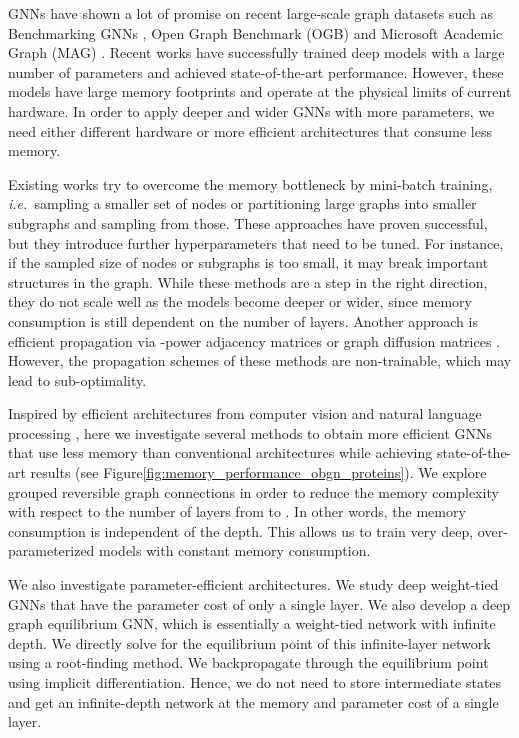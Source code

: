 \documentclass{article}
\newcommand{\ie}{\emph{i.e.~}}
\newcommand{\figLabel}{Figure\xspace}
\begin{document}
GNNs have shown a lot of promise on recent large-scale graph datasets such as Benchmarking GNNs \citep{dwivedi2020benchmarkgnns}, Open Graph Benchmark (OGB) \citep{hu2020open,hu2021ogblsc} and Microsoft Academic Graph (MAG) \citep{wang2020microsoft}. Recent works \citep{li2019deepgcns,li2020deepergcn,chen2020simple} have successfully trained deep models with a large number of parameters and achieved state-of-the-art performance. 
However, these models have large memory footprints and operate at the physical limits of current hardware. 
In order to apply deeper and wider GNNs with more parameters, we need either different hardware or more efficient architectures that consume less memory.

Existing works try to overcome the memory bottleneck by mini-batch training, \ie sampling a smaller set of nodes \citep{hamilton2017inductive,chen2018stochastic,chen2018fastgcn} or partitioning large graphs \citep{chiang2019cluster,graphsaint-iclr20} into smaller subgraphs and sampling from those. These approaches have proven successful, but they introduce further hyperparameters that need to be tuned. For instance, if the sampled size of nodes or subgraphs is too small, it may break important structures in the graph. While these methods are a step in the right direction, they do not scale well as the models become deeper or wider, since memory consumption is still dependent on the number of layers.
Another approach is efficient propagation via -power adjacency matrices or graph diffusion matrices \citep{wu2019simplifying,klicpera_predict_2019,bojchevski2020scaling,liu2020towards,sign_icml_grl2020}. However, the propagation schemes of these methods are non-trainable, which may lead to sub-optimality.

Inspired by efficient architectures from computer vision and natural language processing \citep{gomez2017reversible,xie2017aggregated,bai2018trellis,bai2019deep}, here we investigate several methods to obtain more efficient GNNs that use less memory than conventional architectures while achieving state-of-the-art results (see \figLabel \ref{fig:memory_performance_obgn_proteins}). We explore grouped reversible graph connections in order to reduce the memory complexity with respect to the number of layers from  to . In other words, the memory consumption is independent of the depth. This allows us to train very deep, over-parameterized models with constant memory consumption. 

We also investigate parameter-efficient architectures. We study deep weight-tied GNNs that have the parameter cost of only a single layer. We also develop a deep graph equilibrium GNN, which is essentially a weight-tied network with infinite depth. We directly solve for the equilibrium point of this infinite-layer network using a root-finding method. We backpropagate through the equilibrium point using implicit differentiation. Hence, we do not need to store intermediate states and get an infinite-depth network at the memory and parameter cost of a single layer.
\end{document}
